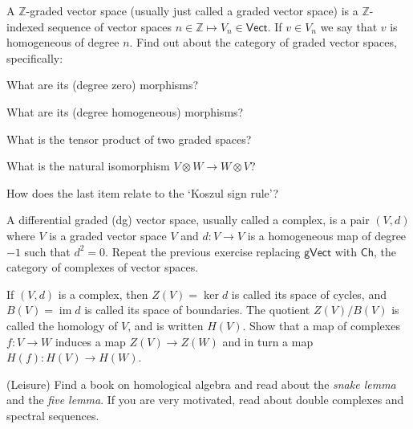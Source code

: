 \begin{question} A $\mathbb Z$-graded vector space (usually 
just called a graded vector space) is a $\mathbb Z$-indexed 
sequence of vector spaces $n\in\mathbb Z\longmapsto V_n\in\mathsf{Vect}$. 
If $v\in V_n$ we say that $v$ is homogeneous of
degree $n$. Find out about the category of
graded vector spaces, specifically:
\begin{titemize}
\item What are its (degree zero) morphisms?
\item What are its (degree homogeneous) morphisms?
\item What is the tensor product of two graded spaces?
\item What is the natural isomorphism $V\otimes W\longrightarrow W\otimes V$?
\item How does the last item relate to the `Koszul sign
rule'?
\end{titemize}
\end{question}

\begin{question} A differential graded (dg) vector space,
usually called a complex, is a pair $(V,d)$ where $V$ is 
a graded vector space $V$ and $d: V \to V$ is a homogeneous
map of degree $-1$ such that $d^2=0$. Repeat the previous
exercise replacing $\mathsf{gVect}$ with $\mathsf{Ch}$,
the category of complexes of vector spaces.
\end{question}

\begin{question} If $(V,d)$ is a complex, then $Z(V) = \ker d$ 
is called its space of cycles, and $B(V) = \operatorname{im} d$ 
is called
its space of boundaries. The quotient $Z(V)/B(V)$ is called
the homology of $V$, and is written $H(V)$. Show that a map 
of complexes $f:V\to W$ induces a map $Z(V) \to Z(W)$ and 
in turn a map $H(f) : H(V) \to H(W)$. 
\end{question}
 
\begin{question} (Leisure) Find a book on homological algebra
and read about the \emph{snake lemma} and the \emph{five lemma}.
If you are very motivated, read about double complexes and spectral
sequences.
\end{question}